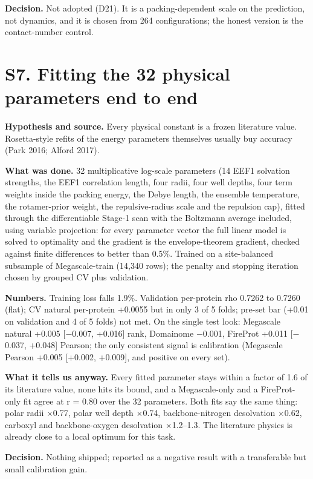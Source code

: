 \documentclass[11pt,a4paper]{article}
\begin{document}
\textbf{Decision.} Not adopted (D21). It is a packing-dependent scale on the prediction, not dynamics, and it is
chosen from 264 configurations; the honest version is the contact-number control.



\section{S7. Fitting the 32 physical parameters end to end}

\textbf{Hypothesis and source.} Every physical constant is a frozen literature value. Rosetta-style refits of the
energy parameters themselves usually buy accuracy (Park 2016; Alford 2017).

\textbf{What was done.} 32 multiplicative log-scale parameters (14 EEF1 solvation strengths, the EEF1 correlation
length, four radii, four well depths, four term weights inside the packing energy, the Debye length, the
ensemble temperature, the rotamer-prior weight, the repulsive-radius scale and the repulsion cap), fitted
through the differentiable Stage-1 scan with the Boltzmann average included, using variable projection: for
every parameter vector the full linear model is solved to optimality and the gradient is the envelope-theorem
gradient, checked against finite differences to better than 0.5\%. Trained on a site-balanced subsample of
Megascale-train (14,340 rows); the penalty and stopping iteration chosen by grouped CV plus validation.

\textbf{Numbers.} Training loss falls 1.9\%. Validation per-protein rho 0.7262 to 0.7260 (flat); CV natural
per-protein +0.0055 but in only 3 of 5 folds; pre-set bar (+0.01 on validation and 4 of 5 folds) not met. On the
single test look: Megascale natural +0.005 [$-$0.007, +0.016] rank, Domainome $-$0.001, FireProt +0.011
[$-$0.037, +0.048] Pearson; the only consistent signal is calibration (Megascale Pearson +0.005
[+0.002, +0.009], and positive on every set).

\textbf{What it tells us anyway.} Every fitted parameter stays within a factor of 1.6 of its literature value, none
hits its bound, and a Megascale-only and a FireProt-only fit agree at r = 0.80 over the 32 parameters. Both fits
say the same thing: polar radii $\times$0.77, polar well depth $\times$0.74, backbone-nitrogen desolvation $\times$0.62, carboxyl and
backbone-oxygen desolvation $\times$1.2--1.3. The literature physics is already close to a local optimum for this task.

\textbf{Decision.} Nothing shipped; reported as a negative result with a transferable but small calibration gain.
\end{document}
